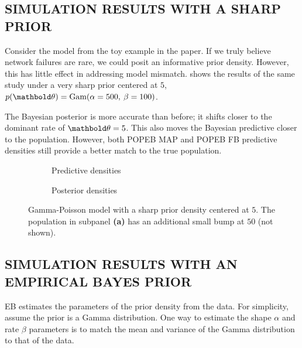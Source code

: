 \subsection*{SIMULATION RESULTS WITH A SHARP PRIOR\hspace*{-20pt}}

Consider the model from the toy example in the paper.
If we truly believe network failures are rare, we could posit an informative
prior density. However, this has little effect in addressing model mismatch.
 shows the results of the
same study under a very sharp prior centered at $5$, $p(\mbtheta) = \Gam
(\alpha=500,\: \beta=100)$.

The Bayesian posterior is more accurate than before; it shifts closer to the
dominant rate of $\mbtheta=5$. This also moves the Bayesian predictive closer
to  the population. However, both \gls{POPEB}
\gls{MAP} and \gls{POPEB} \gls{FB} predictive densities still provide a better
match to the true population.

\begin{figure}[!htb]
\centering
\hspace*{1pt}
\begin{subfigure}[b]{0.45\textwidth}
  
  \vspace*{-16pt}
  \caption{Predictive densities}
  \label{subfig:sharp_prior_gamma_poisson_A}
\end{subfigure}

\vspace*{12pt}
\begin{subfigure}[b]{0.45\textwidth}
  
  \vspace*{-16pt}
  \caption{Posterior densities}
  \label{subfig:sharp_prior_gamma_poisson_B}
\end{subfigure}

\caption{Gamma-Poisson model with a sharp prior density centered at $5$. The
population in subpanel \textbf{(a)} has an additional small bump at $50$ (not
shown).}
\label{fig:sharp_prior_gamma_poisson_multiple}
\end{figure}

\subsection*{SIMULATION RESULTS WITH AN EMPIRICAL BAYES PRIOR}

\Gls{EB} estimates the parameters of the prior density from the
data. For simplicity, assume the prior is a Gamma distribution. One way to
estimate the shape $\alpha$ and rate $\beta$ parameters is to match the mean and
variance of the Gamma distribution to that of the data.

